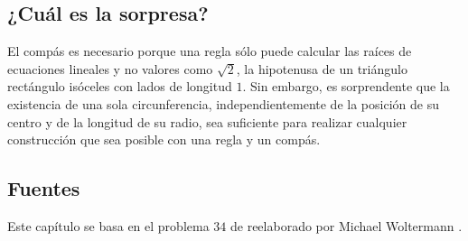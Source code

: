 \subsection*{¿Cuál es la sorpresa?}

El compás es necesario porque una regla sólo puede calcular las raíces de ecuaciones lineales y no valores como $\sqrt{2}$, la hipotenusa de un triángulo rectángulo isóceles con lados de longitud $1$. Sin embargo, es sorprendente que la existencia de una sola circunferencia, independientemente de la posición de su centro y de la longitud de su radio, sea suficiente para realizar cualquier construcción que sea posible con una regla y un compás.

\subsection*{Fuentes}

Este capítulo se basa en el problema $34$ de \cite{dorrie1} reelaborado por Michael Woltermann \cite{dorrie2}.
